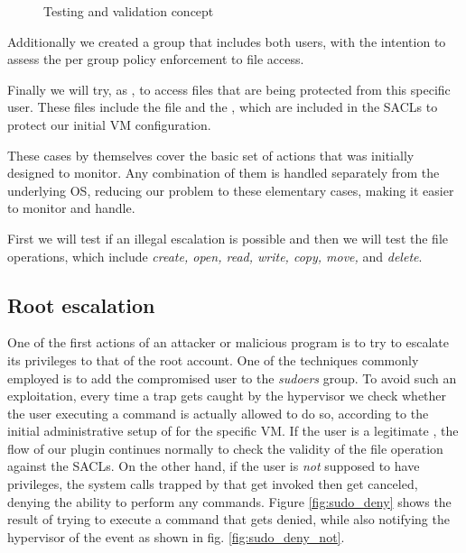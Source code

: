 \begin{figure}[ht]
	\centering
	
	\caption{Testing and validation concept}
	\label{fig:attack}
\end{figure}


\par Additionally we created a group that includes both users, with the intention to assess the per group policy enforcement to file access. 

\par Finally we will try, as , to access files that are being protected from this specific user. These files include the  file and the , which are included in the \acp{SACL} to protect our initial \ac{VM} configuration.

\par These cases by themselves cover the basic set of actions that  was initially designed to monitor. Any combination of them is handled separately from the underlying \ac{OS}, reducing our problem to these elementary cases, making it easier to monitor and handle.

\par First we will test if an illegal  escalation is possible and then we will test the file operations, which include \emph{create, open, read, write, copy, move,} and \emph{delete}.

\subsection{Root escalation}

\par One of the first actions of an attacker or malicious program is to try to escalate its privileges to that of the root account. One of the techniques commonly employed is to add the compromised user to the \emph{sudoers} group. To avoid such an exploitation, every time a trap gets caught by the hypervisor we check whether the user executing a  command is actually allowed to do so, according to the initial administrative setup of  for the specific \ac{VM}. If the user is a legitimate , the flow of our plugin continues normally to check the validity of the file operation against the \acp{SACL}. On the other hand, if the user is \emph{not} supposed to have  privileges, the system calls trapped by  that get invoked then get canceled, denying the ability to perform any  commands. Figure \ref{fig:sudo_deny} shows the result of trying to execute a  command that gets denied, while also notifying the hypervisor of the event as shown in fig. \ref{fig:sudo_deny_not}.

